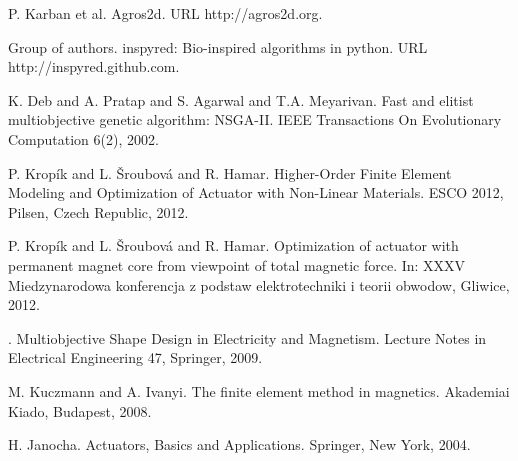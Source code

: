 \documentclass[article,A4,11pt]{llncs}%
\begin{document}

\begin{thebibliography}{10}
{\sc P. Karban et al}. {Agros2d}. URL http://agros2d.org.

{\sc Group of authors}. {inspyred: Bio-inspired algorithms in python}. URL http://inspyred.github.com.

{\sc K. Deb and A. Pratap and S. Agarwal and T.A. Meyarivan}. {Fast and elitist multiobjective genetic algorithm: NSGA-II}. IEEE Transactions On Evolutionary Computation 6(2), 2002.

{\sc P. Krop\'{i}k and L. \v{S}roubov\'{a} and R. Hamar}. {Higher-Order Finite Element Modeling and Optimization of Actuator with Non-Linear Materials}. ESCO 2012, Pilsen, Czech Republic, 2012.

{\sc P. Krop\'{i}k and L. \v{S}roubov\'{a} and R. Hamar}. {Optimization of actuator with permanent magnet core from viewpoint of total magnetic force}. In: XXXV Miedzynarodowa konferencja z podstaw elektrotechniki i teorii obwodow, Gliwice, 2012.

{}. {Multiobjective Shape Design in Electricity and Magnetism}. Lecture Notes in Electrical Engineering 47, Springer, 2009.

{\sc M. Kuczmann and A. Ivanyi}. {The finite element method in magnetics}. Akademiai Kiado, Budapest, 2008.

{\sc H. Janocha}. {Actuators, Basics and Applications}. Springer, New York, 2004.
\end{thebibliography}
\end{document}
